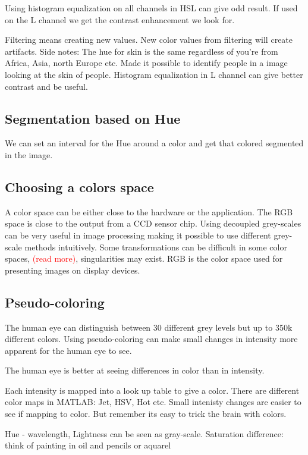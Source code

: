 Using histogram equalization on all channels in HSL can give odd result. If used on the L channel we get the contrast enhancement we look for. 

\begin{wbox}{}
Filtering means creating new values. New color values from filtering will create artifacts. 
Side notes: The hue for skin is the same regardless of you're from Africa, Asia, north Europe etc. Made it possible to identify people in a image looking at the skin of people. Histogram equalization in L channel can give better contrast and be useful. 
\end{wbox}

\subsection*{Segmentation based on Hue}
We can set an interval for the Hue around a color and get that colored segmented in the image. 


\subsection*{Choosing a colors space}
A color space can be either close to the hardware or the application. The RGB space is close to the output from a CCD sensor chip. Using decoupled grey-scales can be very useful in image processing making it possible to use different grey-scale methods intuitively. Some transformations can be difficult in some color spaces, \textcolor{red}{(read more)}, singularities may exist. 
RGB is the color space used for presenting images on display devices. 


\subsection*{Pseudo-coloring}
The human eye can distinguish between 30 different grey levels but up to 350k different colors. Using pseudo-coloring can make small changes in intensity more apparent for the human eye to see.
\begin{example}{}
The human eye is better at seeing differences in color than in intensity. 
\end{example}	

\begin{wbox}{}
Each intensity is mapped into a look up table to give a color. There are different color maps in MATLAB: Jet, HSV, Hot etc. 
Small intenisty changes are easier to see if mapping to color. 
But remember its easy to trick the brain with colors. 

Hue - wavelength, Lightness can be seen as gray-scale. Saturation difference: think of painting in oil and pencils or aquarel
\end{wbox}



